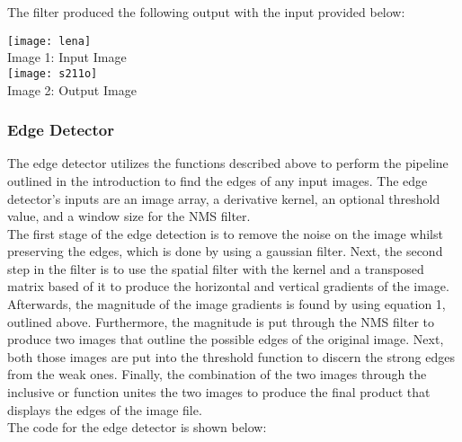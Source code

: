 \documentclass{article}
\begin{document}
	The filter produced the following output with the input provided below:\\
	
	\begin{center}
		\noindent \texttt{[image: lena]}\\
		Image 1: Input Image\\
		
		\texttt{[image: s211o]}\\
		Image 2: Output Image\\
	\end{center}
	
	\subsubsection{Edge Detector}
	
	The edge detector utilizes the functions described above to perform the pipeline outlined in the introduction to find the edges of any input images. The edge detector's inputs are an image array, a derivative kernel, an optional threshold value, and a window size for the NMS filter. \\
	
	The first stage of the edge detection is to remove the noise on the image whilst preserving the edges, which is done by using a gaussian filter. Next, the second step in the filter is to use the spatial filter with the kernel and a transposed matrix based of it to produce the horizontal and vertical gradients of the image. Afterwards, the magnitude of the image gradients is found by using equation 1, outlined above. Furthermore, the magnitude is put through the NMS filter to produce two images that outline the possible edges of the original image. Next, both those images are put into the threshold function to discern the strong edges from the weak ones. Finally, the combination of the two images through the inclusive or function unites the two images to produce the final product that displays the edges of the image file.\\
	
	The code for the edge detector is shown below:\\
	
\end{document}
